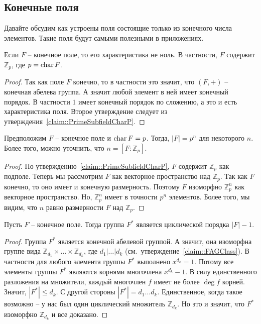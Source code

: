 \subsection{Конечные поля}

Давайте обсудим как устроены поля состоящие только из конечного числа элементов.
Такие поля будут самыми полезными в приложениях.

\begin{claim}
Если $F$ -- конечное поле, то его характеристика не ноль.
В частности, $F$ содержит $\mathbb Z_p$, где $p = \operatorname{char} F$.
\end{claim}
\begin{proof}
Так как поле $F$ конечно, то в частности это значит, что $(F, +)$ -- конечная абелева группа.
А значит любой элемент в ней имеет конечный порядок.
В частности $1$ имеет конечный порядок по сложению, а это и есть характеристика поля.
Второе утверждение следует из утверждения~\ref{claim::PrimeSubfieldCharP}.
\end{proof}

\begin{claim}
Предположим $F$ -- конечное поле и $\operatorname{char} F = p$.
Тогда, $|F| = p^n$ для некоторого $n$.
Более того, можно уточнить, что $n = [F:\mathbb Z_p]$.
\end{claim}
\begin{proof}
По утверждению~\ref{claim::PrimeSubfieldCharP}, $F$ содержит $\mathbb Z_p$ как подполе.
Теперь мы рассмотрим $F$ как векторное пространство над $\mathbb Z_p$.
Так как $F$ конечно, то оно имеет и конечную размерность.
Поэтому $F$ изоморфно $\mathbb Z_p^n$ как векторное пространство.
Но, $\mathbb Z_p^n$ имеет в точности $p^n$ элементов.
Более того, мы видим, что $n$ равно размерности $F$ над $\mathbb Z_p$.
\end{proof}

\begin{claim}
Пусть $F$ -- конечное поле.
Тогда группа $F^*$ является циклической порядка $|F| - 1$.
\end{claim}
\begin{proof}
Группа $F^*$ является конечной абелевой группой.
А значит, она изоморфна группе вида $\mathbb Z_{d_1}\times \ldots \times \mathbb Z_{d_k}$, где $d_1|\ldots |d_k$ (см.~утверждение~\ref{claim::FAGClass}).
В частности для любого элемента группы $F^*$ выполнено $x^{d_k} = 1$.
Потому все элементы группы $F^*$ являются корнями многочлена $x^{d_k}-1$.
В силу единственного разложения на множители, каждый многочлен $f$ имеет не более $\deg f$ корней.
Значит, $|F^*|\leqslant d_k$.
С другой стороны $|F^*| = d_1\ldots d_k$.
Единственное, когда такое возможно -- у нас был один циклический множитель $\mathbb Z_{d_k}$.
Но это и значит, что $F^*$ изоморфно $\mathbb Z_{d_k}$ и все доказано.
\end{proof}

